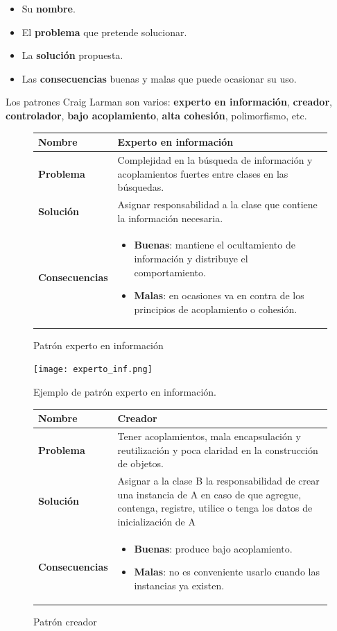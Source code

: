 \documentclass[12pt,spanish]{article}
\begin{document}
\begin{itemize}
	\item Su \textbf{nombre}.
	\item El \textbf{problema} que pretende solucionar.
	\item La \textbf{solución} propuesta.
	\item Las \textbf{consecuencias} buenas y malas que puede ocasionar su uso.
\end{itemize}

Los patrones Craig Larman son varios: \textbf{experto en información}, \textbf{creador}, \textbf{controlador}, \textbf{bajo acoplamiento}, \textbf{alta cohesión}, polimorfismo, etc.

\begin{figure}[H]
\centering
\begin{tabular}{|m{5cm}|m{8cm}|}
\hline
\textbf{Nombre} & Experto en información\\
\hline
\textbf{Problema} & Complejidad en la búsqueda de información y acoplamientos fuertes entre clases en las búsquedas.\\
\hline
\textbf{Solución} & Asignar responsabilidad a la clase que contiene la información necesaria.\\
\hline
\textbf{Consecuencias} & 
\begin{itemize}
	\item \textbf{Buenas}: mantiene el ocultamiento de información y distribuye el comportamiento.
	\item \textbf{Malas}: en ocasiones va en contra de los principios de acoplamiento o cohesión.
\end{itemize}\\
\hline
\end{tabular}
\caption{Patrón experto en información}
\end{figure}

\begin{figure}[H]
\centering
\texttt{[image: experto\_inf.png]}
\caption{Ejemplo de patrón experto en información.}
\end{figure}

\begin{figure}[H]
\centering
\begin{tabular}{|m{5cm}|m{8cm}|}
\hline
\textbf{Nombre} & Creador\\
\hline
\textbf{Problema} & Tener acoplamientos, mala encapsulación y reutilización y poca claridad en la construcción de objetos.\\
\hline
\textbf{Solución} & Asignar a la clase B la responsabilidad de crear una instancia de A en caso de que agregue, contenga, registre, utilice o tenga los datos de inicialización de A\\
\hline
\textbf{Consecuencias} & 
\begin{itemize}
	\item \textbf{Buenas}: produce bajo acoplamiento.
	\item \textbf{Malas}: no es conveniente usarlo cuando las instancias ya existen.
\end{itemize}\\
\hline
\end{tabular}
\caption{Patrón creador}
\end{figure}
\end{document}
